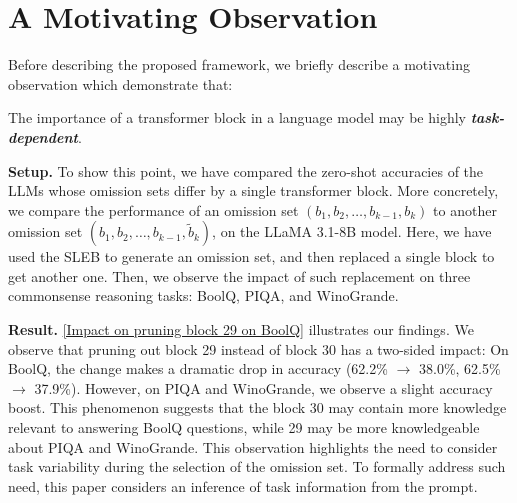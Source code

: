 
\section{A Motivating Observation}\label{sec:observation}

Before describing the proposed framework, we briefly describe a motivating observation which demonstrate that:

\begin{tcolorbox}[boxsep=0pt,colback=black!5 , before skip=10pt, after skip=10pt]
The importance of a transformer block in a language model may be highly \textbf{\textit{task-dependent}}.
\end{tcolorbox}

\textbf{Setup.} To show this point, we have compared the zero-shot accuracies of the LLMs whose omission sets differ by a single transformer block. More concretely, we compare the performance of an omission set $(b_1,b_2,\ldots,b_{k-1},b_k)$ to another omission set $(b_1,b_2,\ldots,b_{k-1},\tilde{b}_k)$, on the LLaMA 3.1-8B model. Here, we have used the SLEB \citep{songsleb} to generate an omission set, and then replaced a single block to get another one. Then, we observe the impact of such replacement on three commonsense reasoning tasks: BoolQ, PIQA, and WinoGrande.

\textbf{Result.} \cref{Impact on pruning block 29 on BoolQ} illustrates our findings. We observe that pruning out block 29 instead of block 30 has a two-sided impact: On BoolQ, the change makes a dramatic drop in accuracy (62.2\% $\to$ 38.0\%, 62.5\% $\to$ 37.9\%). However, on PIQA and WinoGrande, we observe a slight accuracy boost. This phenomenon suggests that the block 30 may contain more knowledge relevant to answering BoolQ questions, while 29 may be more knowledgeable about PIQA and WinoGrande. This observation highlights the need to consider task variability during the selection of the omission set. To formally address such need, this paper considers an inference of task information from the prompt.


